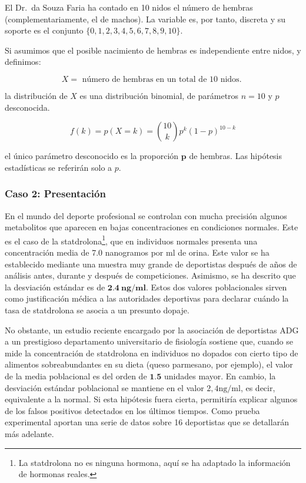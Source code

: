 \documentclass[
]{article}
\begin{document}
El Dr.~da Souza Faria ha contado en 10 nidos el número de hembras (complementariamente, el de machos). La variable es, por tanto, discreta y su soporte es el conjunto \(\{0,1,2,3,4,5,6,7,8,9,10\}\).

Si asumimos que el posible nacimiento de hembras es independiente entre nidos, y definimos:

\[
X=\text { número de hembras en un total de } 10 \text { nidos. }
\]

la distribución de \(X\) es una distribución binomial, de parámetros \(n=10\) y \(p\) desconocida.

\[
f(k)=p(X=k)=\binom{10}{k} p^{k}(1-p)^{10-k}
\]

el único parámetro desconocido es la proporción \(\boldsymbol{p}\) de hembras. Las hipótesis estadísticas se referirán solo a \(p\).

\subsubsection{Caso 2: Presentación}\label{caso-2-presentaciuxf3n}

En el mundo del deporte profesional se controlan con mucha precisión algunos metabolitos que aparecen en bajas concentraciones en condiciones normales. Este es el caso de la statdrolona\footnote{La statdrolona no es ninguna hormona, aquí se ha adaptado la información de hormonas reales.}, que en individuos normales presenta una concentración media de 7.0 nanogramos por ml de orina. Este valor se ha establecido mediante una muestra muy grande de deportistas después de años de análisis antes, durante y después de competiciones. Asimismo, se ha descrito que la desviación estándar es de \(\mathbf{2 . 4 ~ n g} / \mathbf{m l}\). Estos dos valores poblacionales sirven como justificación médica a las autoridades deportivas para declarar cuándo la tasa de statdrolona se asocia a un presunto dopaje.

No obstante, un estudio reciente encargado por la asociación de deportistas ADG a un prestigioso departamento universitario de fisiología sostiene que, cuando se mide la concentración de statdrolona en individuos no dopados con cierto tipo de alimentos sobreabundantes en su dieta (queso parmesano, por ejemplo), el valor de la media poblacional es del orden de \(\mathbf{1 . 5}\) unidades mayor. En cambio, la desviación estándar poblacional se mantiene en el valor \(2,4 \mathrm{ng} / \mathrm{ml}\), es decir, equivalente a la normal. Si esta hipótesis fuera cierta, permitiría explicar algunos de los falsos positivos detectados en los últimos tiempos. Como prueba experimental aportan una serie de datos sobre 16 deportistas que se detallarán más adelante.
\end{document}
